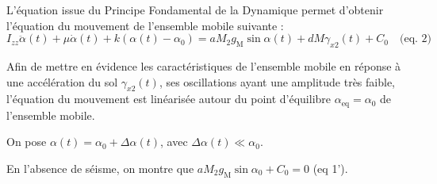 %
%

L'équation issue du Principe Fondamental de la Dynamique permet d'obtenir l'équation du mouvement de l'ensemble mobile suivante :
$$I_{z z} \ddot{\alpha}(t)+\mu \dot{\alpha}(t)+k\left(\alpha(t)-\alpha_{0}\right)=a M_{2} g_{\mathrm{M}} \sin \alpha(t)+d M \gamma_{x 2}(t)+C_{0} \quad \text{(eq. 2)}
$$



Afin de mettre en évidence les caractéristiques de l'ensemble mobile en réponse à une accélération du sol $\gamma_{x 2}(t)$, ses oscillations ayant une amplitude très faible, l'équation du mouvement est linéarisée autour du point d'équilibre $\alpha_{\mathrm{eq}}=\alpha_{0}$ de l'ensemble mobile.

On pose $\alpha(t)=\alpha_{0}+\Delta \alpha(t)$, avec $\Delta \alpha(t) \ll \alpha_{0}$.


En l'absence de séisme, on montre que $a M_{2} g_{\mathrm{M}} \sin \alpha_{0}+C_{0}=0$ (eq 1').
\fi

